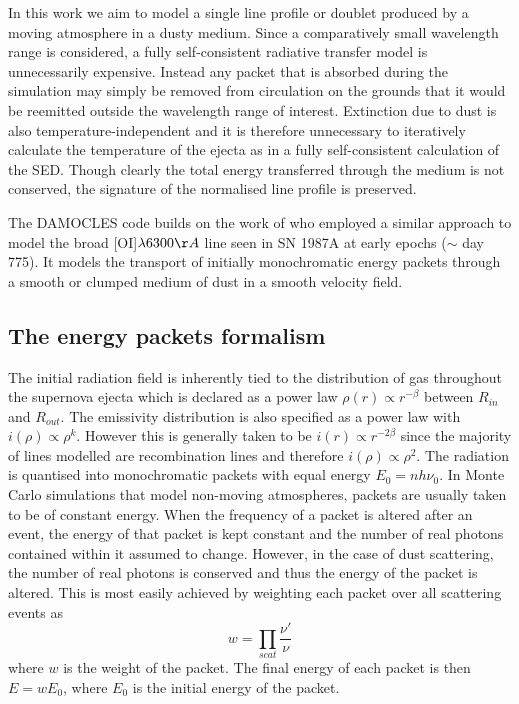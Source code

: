\documentclass[useAMS,usenatbib,usegraphicx]{mnras}
\begin{document}
In this work we aim to model a single line profile or doublet produced by a moving atmosphere in a dusty medium.  Since a comparatively small wavelength range is considered, a fully self-consistent radiative transfer model is unnecessarily expensive.  Instead any packet that is absorbed during the simulation may simply be removed from circulation on the grounds that it would be reemitted outside the wavelength range of interest.   Extinction due to dust is also temperature-independent and it is therefore unnecessary to iteratively calculate the temperature of the ejecta as in a fully self-consistent calculation of the SED.  Though clearly the total energy transferred through the medium is not conserved, the signature of the normalised line profile is preserved.

The DAMOCLES code builds on the work of \citet{Lucy1989a} who employed a similar approach to model the broad [OI]$\lambda 6300\AA$ line seen in SN 1987A at early epochs ($\sim$ day 775).  It models the transport of initially monochromatic energy packets through a smooth or clumped medium of dust in a smooth velocity field.


\subsection{The energy packets formalism}
\label{packets}
The initial radiation field is inherently tied to the distribution of gas throughout the supernova ejecta which is declared as a  power law  $\rho(r) \propto r^{-\beta}$ between $R_{in}$ and $R_{out}$. The emissivity distribution is also specified as a power law with $i(\rho) \propto \rho^{k}$.  However this is generally taken to be $i(r) \propto r ^{-2\beta}$ since the majority of lines modelled are recombination lines and therefore $i(\rho) \propto \rho^2$.  The radiation is quantised into monochromatic packets with equal energy $E_{0}=nh\nu_{0}$.  In Monte Carlo simulations that model non-moving atmospheres, packets are usually taken to be of constant energy.  When the frequency of a packet is altered after an event, the energy of that packet is kept constant and the number of real photons contained within it assumed to change.  However, in the case of dust scattering, the number of real photons is conserved and thus the energy of the packet is altered.  This is most easily achieved by weighting each packet over all scattering events as \[w=\prod_{scat} \frac{\nu'}{\nu}\] where $w$ is the weight of the packet.  The final energy of each packet is then $E=wE_0$, where $E_0$ is the initial energy of the packet.
\end{document}
